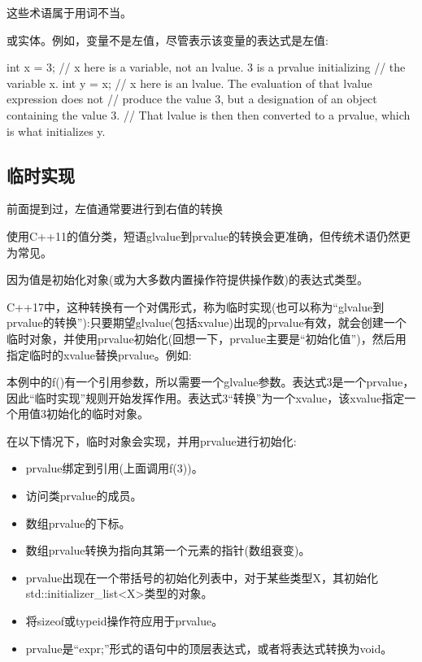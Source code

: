 \begin{notice}
这些术语属于用词不当。
\end{notice}

或实体。例如，变量不是左值，尽管表示该变量的表达式是左值:

\begin{cpp}
int x = 3; // x here is a variable, not an lvalue. 3 is a prvalue initializing
		  // the variable x.
int y = x; // x here is an lvalue. The evaluation of that lvalue expression does not
		  // produce the value 3, but a designation of an object containing the value 3.
		  // That lvalue is then then converted to a prvalue, which is what initializes y.
\end{cpp}

\subsection{临时实现}

前面提到过，左值通常要进行到右值的转换

\begin{notice}
使用C++11的值分类，短语glvalue到prvalue的转换会更准确，但传统术语仍然更为常见。
\end{notice}

因为值是初始化对象(或为大多数内置操作符提供操作数)的表达式类型。

C++17中，这种转换有一个对偶形式，称为临时实现(也可以称为“glvalue到prvalue的转换”):只要期望glvalue(包括xvalue)出现的prvalue有效，就会创建一个临时对象，并使用prvalue初始化(回想一下，prvalue主要是“初始化值”)，然后用指定临时的xvalue替换prvalue。例如:

本例中的f()有一个引用参数，所以需要一个glvalue参数。表达式3是一个prvalue，因此“临时实现”规则开始发挥作用。表达式3“转换”为一个xvalue，该xvalue指定一个用值3初始化的临时对象。

在以下情况下，临时对象会实现，并用prvalue进行初始化:

\begin{itemize}
\item 
prvalue绑定到引用(上面调用f(3))。

\item 
访问类prvalue的成员。

\item 
数组prvalue的下标。

\item 
数组prvalue转换为指向其第一个元素的指针(数组衰变)。

\item 
prvalue出现在一个带括号的初始化列表中，对于某些类型X，其初始化std::initializer\_list<X>类型的对象。

\item 
将sizeof或typeid操作符应用于prvalue。

\item 
prvalue是“expr;”形式的语句中的顶层表达式，或者将表达式转换为void。
\end{itemize}

